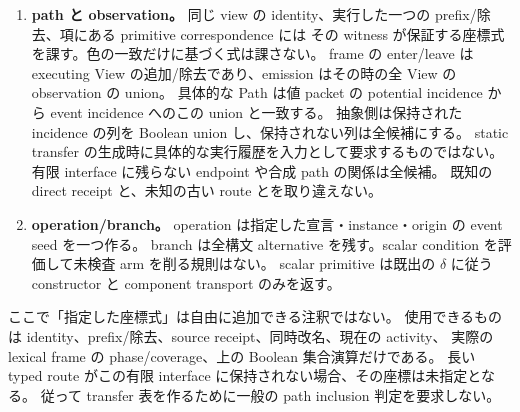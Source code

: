 \documentclass[11pt,a4paper]{article}
\begin{document}
\begin{enumerate}
hidden 点についても同じ構成を行う。bound な vector \(\beta\) は、
非作用側の列を持つ旧点 \(f_0(\beta)\) と、作用側の列を持つ fresh 点 \(f_1(\beta)\) を生む。
free な点は両側を保った一点になる。出力の region bit はそれぞれの像についての disjunction である。
旧点を同時に消す規則にはしない。共有 storage や元の continuation が旧点を保持しうるからである。
activity は旧 world と再開した frame の実際の active 集合から別に更新する。
hidden な bound 分類が表現されていない場合は、分類の全 refinement にこの構成を適用する。
最後に不要な register/column を forget する。
この有限操作は、hidden bound 名の置き去りと、ambient 側の破壊的な改名の双方を避ける。
receipt column の候補添字も同じ action に従って再索引する。
saved view と ambient candidate のように作用の異なる端点間の route は、
既知の具体対応が保持される場合以外は全候補とする。
旧 candidate と新 candidate の列を、同じ source label を持つことだけでコピーしない。
後の read は同じ置換を metadata 解釈に合成してから現在の activity を観測する。
\item \textbf{path と observation。}
同じ view の identity、実行した一つの prefix/除去、項にある primitive correspondence には
その witness が保証する座標式を課す。色の一致だけに基づく式は課さない。
frame の enter/leave は executing View の追加/除去であり、emission はその時の全 View の observation の union。
具体的な Path は値 packet の potential incidence から event incidence へのこの union と一致する。
抽象側は保持された incidence の列を Boolean union し、保持されない列は全候補にする。
static transfer の生成時に具体的な実行履歴を入力として要求するものではない。
有限 interface に残らない endpoint や合成 path の関係は全候補。
既知の direct receipt と、未知の古い route とを取り違えない。
\item \textbf{operation/branch。}
operation は指定した宣言・instance・origin の event seed を一つ作る。
branch は全構文 alternative を残す。scalar condition を評価して未検査 arm を削る規則はない。
scalar primitive は既出の \(\delta\) に従う constructor と component transport のみを返す。
\end{enumerate}

ここで「指定した座標式」は自由に追加できる注釈ではない。
使用できるものは identity、prefix/除去、source receipt、同時改名、現在の activity、
実際の lexical frame の phase/coverage、上の Boolean 集合演算だけである。
長い typed route がこの有限 interface に保持されない場合、その座標は未指定となる。
従って transfer 表を作るために一般の path inclusion 判定を要求しない。
\end{document}

